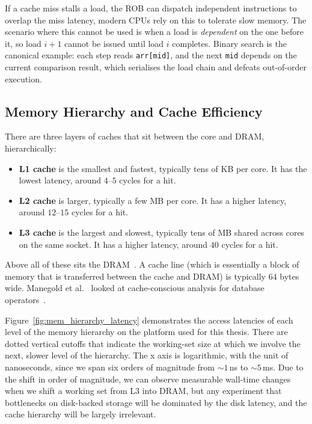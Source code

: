 If a cache miss stalls a load, the ROB can dispatch independent instructions to overlap the miss latency, modern CPUs rely on this to tolerate slow memory. The scenario where this cannot be used is when a load is \emph{dependent} on the one before it, so load $i+1$ cannot be issued until load $i$ completes. Binary search is the canonical example: each step reads \texttt{arr[mid]}, and the next \texttt{mid} depends on the current comparison result, which serialises the load chain and defeats out-of-order execution.

\subsection{Memory Hierarchy and Cache Efficiency\label{sec:bg:memory}\label{sec:sb:memhier}}

There are three layers of caches that sit between the core and DRAM, hierarchically:
\begin{itemize}
  \item \textbf{L1 cache} is the smallest and fastest, typically tens of KB per core. It has the lowest latency, around $4$--$5$ cycles for a hit.
  \item \textbf{L2 cache} is larger, typically a few MB per core. It has a higher latency, around $12$--$15$ cycles for a hit.
  \item \textbf{L3 cache} is the largest and slowest, typically tens of MB shared across cores on the same socket. It has a higher latency, around $40$ cycles for a hit.
\end{itemize}

Above all of these sits the DRAM~\cite{hennessy_2017,drepper_2007}. A cache line (which is essentially a block of memory that is transferred between the cache and DRAM) is typically $64$ bytes wide. Manegold et al. \ looked at cache-conscious analysis for database operators~\cite{manegold_2000}.

Figure~\ref{fig:mem_hierarchy_latency} demonstrates the access latencies of each level of the memory hierarchy on the platform used for this thesis. There are dotted vertical cutoffs that indicate the working-set size at which we involve the next, slower level of the hierarchy. The x axis is logarithmic, with the unit of nanoseconds, since we span six orders of magnitude from $\sim\!1$\,ns to $\sim\!5$\,ms. Due to the shift in order of magnitude, we can observe measurable wall-time changes when we shift a working set from L3 into DRAM, but any experiment that bottlenecks on disk-backed storage will be dominated by the disk latency, and the cache hierarchy will be largely irrelevant.

